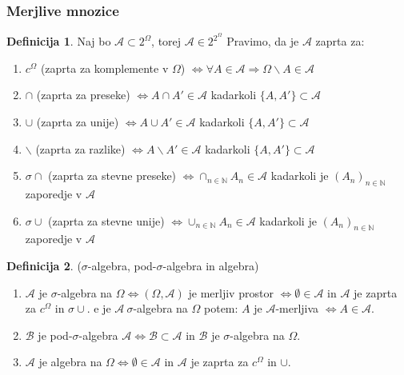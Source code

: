 \documentclass[a4paper,12pt]{article}
\theoremstyle{definition} %
\newtheorem{definicija}{Definicija}[section]
\theoremstyle{plain} %
\newcommand{\N}{\mathbb{N}}
\newcommand{\A}{\mathcal{A}}
\begin{document}
        \subsubsection{Merjlive mnozice}
            \begin{definicija}
                Naj bo $\mathcal{A} \subset 2^\Omega$, torej $\mathcal{A} \in 2^{2^\Omega}$ Pravimo, da je $\mathcal{A}$ zaprta za:
                \begin{enumerate}
                    \item $c^\Omega$ (zaprta za komplemente v $\Omega$) $\iff \forall A \in \mathcal{A} \Rightarrow \Omega \backslash A \in \mathcal{A} $
                    \item $\cap $ (zaprta za preseke) $\iff A \cap A' \in \mathcal{A}$ kadarkoli $\{A, A'\} \subset \mathcal{A}$
                    \item $\cup$ (zaprta za unije) $\iff  A \cup A' \in \mathcal{A}$ kadarkoli $\{A, A'\} \subset \mathcal{A}$
                    \item $\backslash$ (zaprta za razlike) $\iff A \backslash A' \in \mathcal{A}$ kadarkoli $\{A, A'\} \subset \mathcal{A}$
                    \item $\sigma\cap$ (zaprta za stevne preseke) $\iff \cap_{n \in \N}A_n \in \mathcal{A}$ kadarkoli je $\left(A_n \right)_{n \in \N}$ zaporedje v $\mathcal{A}$
                    \item $\sigma\cup$ (zaprta za stevne unije) $\iff \cup_{n \in \N}A_n \in \mathcal{A} $ kadarkoli je $\left(A_n \right)_{n \in \N}$ zaporedje v $\mathcal{A}$
                
                \end{enumerate} 
            \end{definicija}
            
            \begin{definicija}($\sigma$-algebra, pod-$\sigma$-algebra in algebra)
                \begin{enumerate}
                    \item$\mathcal{A}$ je $\sigma$-algebra na $\Omega \iff (\Omega, \A)$ je merljiv prostor $\iff \emptyset \in \mathcal{A}$ in $\mathcal{A}$ je zaprta za $c^\Omega$ in $\sigma\cup$. e je $\mathcal{A} \ \sigma$-algebra na $\Omega$ potem: $A$ je $\mathcal{A}$-merljiva $\iff A \in \mathcal{A}.$
                    \item $\mathcal{B}$ je pod-$\sigma$-algebra $\mathcal{A} \iff \mathcal{B} \subset \mathcal{A}$ in $\mathcal{B}$ je $\sigma$-algebra na $\Omega$.
                    \item $\mathcal{A}$ je algebra na $\Omega \iff \emptyset \in \mathcal{A}$ in $\mathcal{A}$ je zaprta za $c^\Omega$ in $\cup$.
                \end{enumerate}
            \end{definicija}
\end{document}
